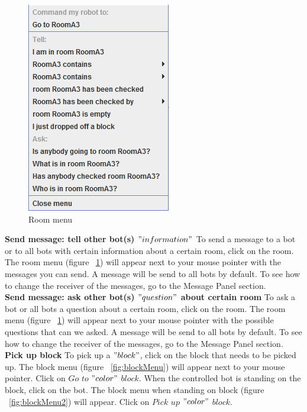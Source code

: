 \begin{figure}[h]
\begin{center}
\includegraphics{NewFeatures/hpg-room-menu.png}
\end{center}
\caption{Room menu}
\label{fig:roomMenu}
\end{figure}
\raggedright{\textbf{Send message: tell other bot(s) $"information"$}}
To send a message to a bot or to all bots with certain information about a certain room, click on the room. The room menu (figure ~\ref{fig:roomMenu}) will appear next to your mouse pointer with the messages you can send. A message will be send to all bots by default. To see how to change the receiver of the messages, go to the Message Panel section.
\\
\textbf{Send message: ask other bot(s) $"question"$ about certain room}
To ask a bot or all bots a question about a certain room, click on the room. The room menu (figure ~\ref{fig:roomMenu}) will appear next to your mouse pointer with the possible questions that can we asked. A message will be send to all bots by default. To see how to change the receiver of the messages, go to the Message Panel section.
\\
\textbf{Pick up block}
To pick up a $"block"$, click on the block that needs to be picked up. The block menu (figure ~\ref{fig:blockMenu}) will appear next to your mouse pointer. Click on $Go$ $to$ $"color"$ $block$. When the controlled bot is standing on the block, click on the bot. The block menu when standing on block (figure ~\ref{fig:blockMenu2}) will appear. Click on $Pick$ $up$ $"color"$ $block$.
\\
